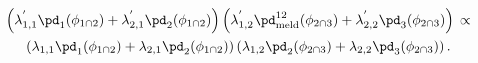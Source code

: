 \begin{multline}
  \left(
    \lambda^{'}_{1, 1}\pd_{1}(\phi_{1 \cap 2}) +
    \lambda^{'}_{2, 1}\pd_{2}(\phi_{1 \cap 2}) 
  \right)
  \left(
    \lambda^{'}_{1, 2}\pd_{\text{meld}}^{12}(\phi_{2 \cap 3}) +
    \lambda^{'}_{2, 2}\pd_{3}(\phi_{2 \cap 3})
  \right)
  \, \propto \\
  \left(
    \lambda_{1, 1}\pd_{1}(\phi_{1 \cap 2}) +
    \lambda_{2, 1}\pd_{2}(\phi_{1 \cap 2})
  \right)
  \left(
    \lambda_{1, 2}\pd_{2}(\phi_{2 \cap 3}) +
    \lambda_{2, 2}\pd_{3}(\phi_{2 \cap 3})
  \right).
  \label{eqn:pooling-equality-rhs-lin}
\end{multline}